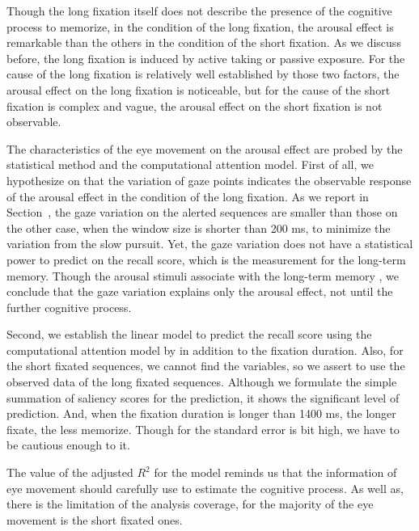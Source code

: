 \documentclass[oneside,master]{snueethesis}
\begin{document}
Though the long fixation itself does not describe the presence of the cognitive process to memorize, in the condition of the long fixation, the arousal effect is remarkable than the others in the condition of the short fixation. As we discuss before, the long fixation is induced by active taking or passive exposure. For the cause of the long fixation is relatively well established by those two factors, the arousal effect on the long fixation is noticeable, but for the cause of the short fixation is complex and vague, the arousal effect on the short fixation is not observable.

The characteristics of the eye movement on the arousal effect are probed by the statistical method and the computational attention model. First of all, we hypothesize on that the variation of gaze points indicates the observable response of the arousal effect in the condition of the long fixation. As we report in Section~, the gaze variation on the alerted sequences are smaller than those on the other case, when the window size is shorter than 200 ms, to minimize the variation from the slow pursuit. Yet, the gaze variation does not have a statistical power to predict on the recall score, which is the measurement for the long-term memory. Though the arousal stimuli associate with the long-term memory \cite{Cahill1996amyg,Cahill1998baso}, we conclude that the gaze variation explains only the arousal effect, not until the further cognitive process. 

Second, we establish the linear model to predict the recall score using the computational attention model by  in addition to the fixation duration. Also, for the short fixated sequences, we cannot find the variables, so we assert to use the observed data of the long fixated sequences. Although we formulate the simple summation of saliency scores for the prediction, it shows the significant level of prediction. And, when the fixation duration is longer than 1400 ms, the longer fixate, the less memorize. Though for the standard error is bit high, we have to be cautious enough to it. 

The value of the adjusted $R^{2}$ for the model reminds us that the information of eye movement should carefully use to estimate the cognitive process. As well as, there is the limitation of the analysis coverage, for the majority of the eye movement is the short fixated ones. 
\end{document}
